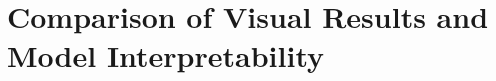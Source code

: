 \section{Comparison of Visual Results and Model Interpretability}
\label{sec:5_interpretability}




